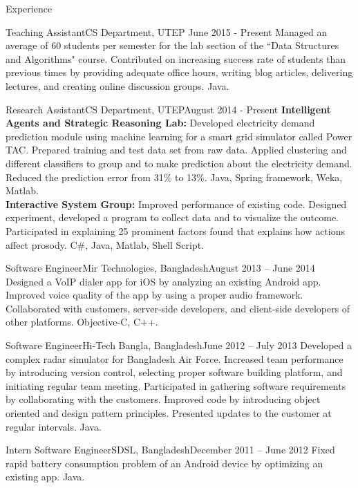 \documentclass[]{mcdowellcv}
\begin{document}
	\makeheader
	
	
	

	\begin{cvsection}{Experience}
		
		\begin{cvsubsection}{Teaching Assistant}{CS Department, UTEP }{June 2015 - Present}
			Managed an average of 60 students per semester for the lab section of the ``Data Structures and Algorithms" course. Contributed on increasing success rate of students than previous times by providing adequate office hours, writing blog articles, delivering lectures, and creating online discussion groups. Java.
		\end{cvsubsection}
		
		\begin{cvsubsection}{Research Assistant}{CS Department, UTEP}{August 2014 - Present}
			\textbf{Intelligent Agents and Strategic Reasoning Lab:} Developed electricity demand prediction module using machine learning for a smart grid simulator called Power TAC. Prepared training and test data set from raw data. Applied clustering and different classifiers to group and to make prediction about the electricity demand. Reduced the prediction error from 31\% to 13\%. Java, Spring framework, Weka, Matlab.\\ 
			\textbf{Interactive System Group:} Improved performance of existing code. Designed experiment, developed a program to collect data and to visualize the outcome. Participated in explaining 25 prominent factors found that explains how actions affect prosody. C\#, Java, Matlab, Shell Script.
		\end{cvsubsection}		
		
		\begin{cvsubsection}{Software Engineer}{Mir Technologies, Bangladesh}{August 2013 -- June 2014}
		Designed a VoIP dialer app for iOS by analyzing an existing Android app. Improved voice quality of the app by using a proper audio framework. Collaborated with customers, server-side developers, and client-side developers of other platforms. Objective-C, C++.
\end{cvsubsection}		
		\begin{cvsubsection}{Software Engineer}{Hi-Tech Bangla, Bangladesh}{June 2012 -- July 2013}	
Developed a complex radar simulator for Bangladesh Air Force. Increased team performance by introducing version control, selecting proper software building platform, and initiating regular team meeting. Participated in gathering software requirements by collaborating with the customers. Improved code by introducing object oriented and design pattern principles. Presented updates to the customer at regular intervals. Java.
		\end{cvsubsection}
		
		\begin{cvsubsection}{Intern Software Engineer}{SDSL, Bangladesh}{December 2011 -- June 2012}	
			Fixed rapid battery consumption problem of an Android device by optimizing an existing app. Java.
		\end{cvsubsection}		
	\end{cvsection}
	
\end{document}
